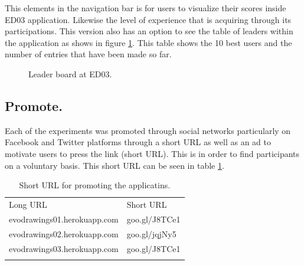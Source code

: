 This elements in the navigation bar is for users to visualize their scores
inside ED03 application. Likewise the level of experience that is acquiring
through its participations. This version also has an option to see the table of
leaders within the application as shows in figure \ref{fig:leaderBoard}. This
table shows the 10 best users and the number of entries that have been made so
far.


\begin{figure}
\captionsetup{justification=centering,margin=2cm}
\centering
\setlength\fboxsep{0pt}
\setlength\fboxrule{0.7pt}
\caption{Leader board at ED03.}
\label{fig:leaderBoard}
\end{figure}


\subsection{Promote.}

Each of the experiments was promoted through social networks particularly on
Facebook and Twitter platforms through a short URL as well as an ad to motivate
users to press the link (short URL). This is in order to find participants on a
voluntary basis. This short URL can be seen in table \ref{tab:PromoteUrl}.

\begin{table}
\small
\caption{Short URL for promoting the applicatins.}
\label{tab:PromoteUrl}
\centering
\small
\begin{tabular}{p{5cm} p{4cm}  }
\hline\noalign{\smallskip}
 Long URL & Short URL \\
\noalign{\smallskip}\hline\noalign{\smallskip}
\small{evodrawings01.herokuapp.com } & \small{goo.gl/J8TCe1}  \\ \hline
\small{evodrawings02.herokuapp.com } & \small{goo.gl/jqjNy5}  \\ \hline
\small{evodrawings03.herokuapp.com} & \small{goo.gl/J8TCe1}  \\ \hline
\noalign{\smallskip}\hline
\end{tabular}
\end{table}


